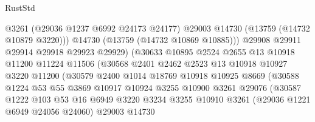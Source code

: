 \begin{lexlean}{RustStd}
\begin{coremodule}
                                  @3261
                                  (@29036 @1237 @6992 @24173 @24177)
                                  @29003
                                  @14730
                                  (@13759 (@14732 @10879 @3220)))
                                @14730
                                (@13759 (@14732 @10869 @10885)))
                              @29908
                              @29911
                              @29914
                              @29918
                              @29923
                              @29929)
                            (@30633
                              @10895
                              @2524
                              @2655
                              @13
                              @10918
                              @11200
                              @11224
                              @11506
                              (@30568
                                @2401
                                @2462
                                @2523
                                @13
                                @10918
                                @10927
                                @3220
                                @11200
                                (@30579
                                  @2400
                                  @1014
                                  @18769
                                  @10918
                                  @10925
                                  @8669
                                  (@30588
                                    @1224
                                    @53
                                    @55
                                    @3869
                                    @10917
                                    @10924
                                    @3255
                                    @10900
                                    @3261
                                    @29076
                                    (@30587
                                      @1222
                                      @103
                                      @53
                                      @16
                                      @6949
                                      @3220
                                      @3234
                                      @3255
                                      @10910
                                      @3261
                                      (@29036 @1221 @6949 @24056 @24060)
                                      @29003
                                      @14730

\end{coremodule}
\end{lexlean}
